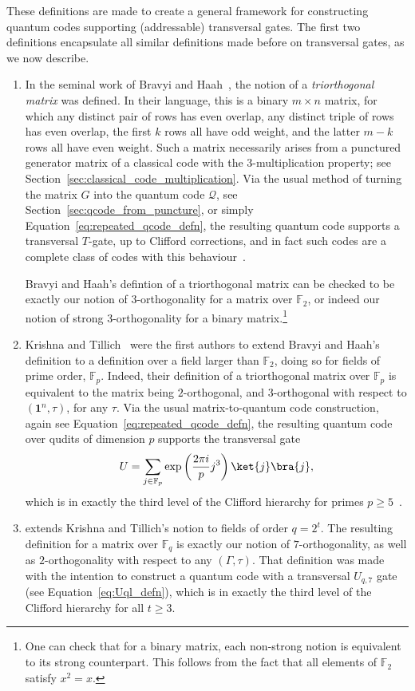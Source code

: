 \documentclass[11pt]{article}
\theoremstyle{definition}
\renewcommand{\geq}{\geqslant}
\newcommand{\qcode}{\mathcal{Q}}
\begin{document}
These definitions are made to create a general framework for constructing quantum codes supporting (addressable) transversal gates. The first two definitions encapsulate all similar definitions made before on transversal gates, as we now describe.
\begin{enumerate}
    \item In the seminal work of Bravyi and Haah~\cite{bravyi2012magic}, the notion of a \textit{triorthogonal matrix} was defined. In their language, this is a binary $m \times n$ matrix, for which any distinct pair of rows has even overlap, any distinct triple of rows has even overlap, the first $k$ rows all have odd weight, and the latter $m-k$ rows all have even weight. Such a matrix necessarily arises from a punctured generator matrix of a classical code with the 3-multiplication property; see Section~\ref{sec:classical_code_multiplication}. Via the usual method of turning the matrix $G$ into the quantum code $\qcode$, see Section~\ref{sec:qcode_from_puncture}, or simply Equation~\eqref{eq:repeated_qcode_defn}, the resulting quantum code supports a transversal $T$-gate, up to Clifford corrections, and in fact such codes are a complete class of codes with this behaviour~\cite{rengaswamy2020optimality}.
    
    Bravyi and Haah's defintion of a triorthogonal matrix can be checked to be exactly our notion of 3-orthogonality for a matrix over $\mathbb{F}_2$, or indeed our notion of strong 3-orthogonality for a binary matrix.\footnote{One can check that for a binary matrix, each non-strong notion is equivalent to its strong counterpart. This follows from the fact that all elements of $\mathbb{F}_2$ satisfy $x^2 = x$.}

    \item Krishna and Tillich~\cite{krishna2019towards} were the first authors to extend Bravyi and Haah's definition to a definition over a field larger than $\mathbb{F}_2$, doing so for fields of prime order, $\mathbb{F}_p$. Indeed, their definition of a triorthogonal matrix over $\mathbb{F}_p$ is equivalent to the matrix being $2$-orthogonal, and $3$-orthogonal with respect to $(\mathbf{1}^n,\tau)$, for any $\tau$. Via the usual matrix-to-quantum code construction, again see Equation~\eqref{eq:repeated_qcode_defn}, the resulting quantum code over qudits of dimension $p$ supports the transversal gate
    \begin{equation}
        U = \sum_{j \in \mathbb{F}_p}\exp\left(\frac{2\pi i}{p}j^3\right)\ket{j}\bra{j},
    \end{equation}
    which is in exactly the third level of the Clifford hierarchy for primes $p \geq 5$~\cite{cui2017diagonal}.
    \item \cite{wills2024constant} extends Krishna and Tillich's notion to fields of order $q=2^t$. The resulting definition for a matrix over $\mathbb{F}_q$ is exactly our notion of $7$-orthogonality, as well as $2$-orthogonality with respect to any $(\Gamma,\tau)$. That definition was made with the intention to construct a quantum code with a transversal $U_{q,7}$ gate (see Equation~\eqref{eq:Uql_defn}), which is in exactly the third level of the Clifford hierarchy for all $t \geq 3$.
\end{enumerate}
\end{document}
